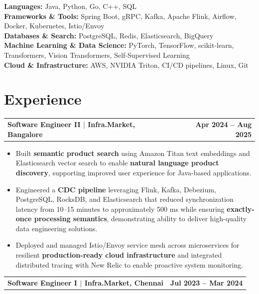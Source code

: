 \documentclass[letterpaper,10pt]{article}
\makeatletter
\newcommand{\entry}[2]{%
  \noindent  
  \begin{tabularx}{\linewidth}  
    {@{}>{\raggedright\arraybackslash}X@{\hspace{6pt}}r@{}}  
    \textbf{#1} & #2  
  \end{tabularx}\par  
}
\newcommand{\bullets}{  
  \begin{itemize}[  
    leftmargin=1.2em,  
    topsep=2pt,  
    itemsep=1pt,  
    parsep=0pt,  
    partopsep=0pt  
  ]  
}
\newcommand{\finishbullets}{  
  \end{itemize}  
}
\makeatother
\begin{document}
\textbf{Languages:}  
Java, Python, Go, C++, SQL \\  

\textbf{Frameworks \& Tools:}  
Spring Boot, gRPC, Kafka, Apache Flink, Airflow, Docker, Kubernetes, Istio/Envoy \\  

\textbf{Databases \& Search:}  
PostgreSQL, Redis, Elasticsearch, BigQuery \\  

\textbf{Machine Learning \& Data Science:}  
PyTorch, TensorFlow, scikit-learn, Transformers, Vision Transformers, Self-Supervised Learning \\  

\textbf{Cloud \& Infrastructure:}  
AWS, NVIDIA Triton, CI/CD pipelines, Linux, Git \\  

\section{Experience}  

\entry  
  {\textbf{Software Engineer II} $|$ \textbf{Infra.Market, Bangalore}}  
  {\textbf{Apr 2024 -- Aug 2025}}  

\bullets  

  \item Built \textbf{semantic product search} using Amazon Titan text embeddings and Elasticsearch vector search to enable \textbf{natural language product discovery}, supporting improved user experience for Java-based applications.  

  \item Engineered a \textbf{CDC pipeline} leveraging Flink, Kafka, Debezium, PostgreSQL, RocksDB, and Elasticsearch that reduced synchronization latency from 10–15 minutes to approximately 500 ms while ensuring \textbf{exactly-once processing semantics}, demonstrating ability to deliver high-quality data engineering solutions.  

  \item Deployed and managed Istio/Envoy service mesh across microservices for resilient \textbf{production-ready cloud infrastructure} and integrated distributed tracing with New Relic to enable proactive system monitoring.  

\finishbullets  

\entry  
  {\textbf{Software Engineer I} $|$ \textbf{Infra.Market, Chennai}}  
  {\textbf{Jul 2023 -- Mar 2024}}  
\end{document}
